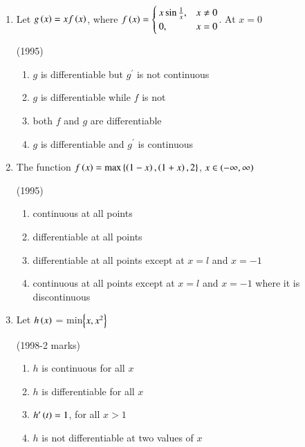 \documentclass[journal]{IEEEtran}
\numberwithin{equation}{enumi}
\numberwithin{figure}{enumi}
\begin{document}
\begin{enumerate}
    \item 
    Let $g\left(x\right)=xf\left(x\right)$, where $f\left(x\right) = \begin{cases}
        x\sin\frac{1}{x}, & x\neq 0\\
        0, & x=0
    \end{cases}$. At $x=0$ 
	
    \hfill(1995)
    
    \begin{enumerate}
      	\item $g$ is differentiable but $g^{\prime}$ is not continuous
        \item $g$ is differentiable while $f$ is not
        \item both $f$ and $g$ are differentiable
	\item $g$ is differentiable and $g^{\prime}$ is continuous 
    \end{enumerate}

    \item 
    The function $f\left(x\right) = \text{max}\left\{\left(1-x\right),\left(1+x\right),2\right\}$, $x\in \left(-\infty,\infty\right)$  

    \hfill(1995)
    
    \begin{enumerate}    
        \item continuous at all points
        \item differentiable at all points
        \item differentiable at all points except at $x=l$ and $x=-1$
        \item continuous at all points except at $x=l$ and $x=-1$ where it is discontinuous
    \end{enumerate}

    \item 
    Let $h\left(x\right)$ = min$\left\{x,x^{2}\right\}$ 
    
    \hfill(1998-2 marks)

    \begin{enumerate}
	\item $h$ is continuous for all $x$
        \item $h$ is differentiable for all $x$
	\item $h^{\prime}\left(t\right)=1$, for all $x>1$
        \item $h$ is not differentiable at two values of $x$
    \end{enumerate}


\end{enumerate}
\end{document}
